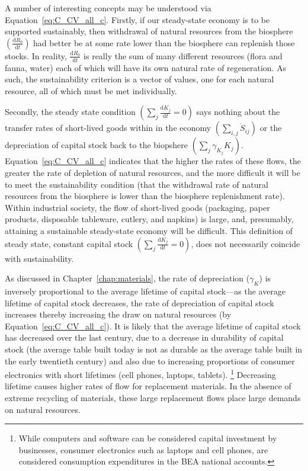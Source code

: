 A number of interesting concepts may be understood via
Equation~\ref{eq:C_CV_all_c}. 
Firstly,
if our steady-state economy is to be supported
sustainably,
then withdrawal of natural resources from the biosphere
$\left(\frac{\mathrm{d}R_{0}}{\mathrm{d}t}\right)$
had better be at some rate lower than the biosphere
can replenish those stocks. 
In reality, 
$\frac{\mathrm{d}R_{0}}{\mathrm{d}t}$
is really the sum of many different resources
(flora and fauna, water) each of which will have
its own natural rate of regeneration.
As such, 
the sustainability criterion  is a vector of values,
one for each natural resource, 
all of which must be met individually.

Secondly,
the steady state condition 
$\left(\sum_{j}\frac{\mathrm{d}K_{j}}{\mathrm{d}t}=0\right)$
says nothing about the transfer rates of short-lived goods 
within in the economy $\left(\sum_{i,j}\dot{S}_{ij}\right)$
or the depreciation of capital stock back to the biopshere
$\left(\sum_{j}\gamma_{K_{j}}K_{j}\right)$.
Equation~\ref{eq:C_CV_all_c} indicates that 
the higher the rates of these flows,
the greater the rate of depletion of
natural resources, and the more difficult it will be to
meet the sustainability condition 
(that the withdrawal rate of natural resources from the biosphere
is lower than the biosphere
replenishment rate).
Within industrial society,
the flow of short-lived goods 
(packaging,
paper products,
disposable tableware,
cutlery,
and napkins)
is large,
and, presumably, attaining a sustainable steady-state economy
will be difficult.
This definition of steady state, constant capital stock 
$\left(\sum_{j}\frac{\mathrm{d}K_{j}}{\mathrm{d}t}=0\right)$,
does not necessarily coincide with sustainability.

As discussed in Chapter~\ref{chap:materials},
the rate of depreciation ($\gamma_{K}$) is inversely
proportional to the average lifetime of capital stock---as
the average lifetime of capital stock decreases,
the rate of depreciation of capital stock increases thereby increasing
the draw on natural resources (by Equation~\ref{eq:C_CV_all_c}).
It is likely that the average lifetime of capital stock has
decreased over the last century, 
due to a decrease in durability of capital stock
(the average table built today is not as durable as the average table
built in the early twentieth century)
and also due to increasing proportions of consumer electronics
with short lifetimes (cell phones, laptops, tablets).%
	\footnote{
	While computers and software can be considered 
	capital investment by businesses, 
	consumer electronics such as laptops and
	cell phones, are considered consumption
	expenditures in the BEA national accounts.
	}
Decreasing lifetime causes higher rates of flow for
replacement materials.
In the absence of extreme recycling of materials,
these large replacement flows place large demands on
natural resources.

